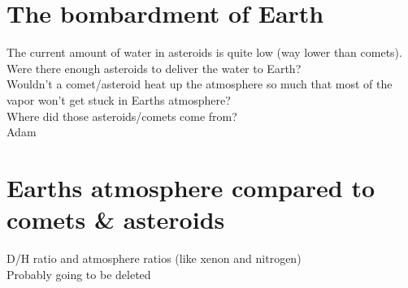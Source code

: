 \documentclass[11pt]{article}
\begin{document}
\section{The bombardment of Earth}
The current amount of water in asteroids is quite low (way lower than comets). Were there enough asteroids to deliver the water to Earth?\\
Wouldn't a comet/asteroid heat up the atmosphere so much that most of the vapor won't get stuck in Earths atmosphere?\\
Where did those asteroids/comets come from?\\
Adam

\newpage
\section{Earths atmosphere compared to comets \& asteroids}
D/H ratio and atmosphere ratios (like xenon and nitrogen)\\
Probably going to be deleted


\newpage				%



\newpage				%



\newpage				%


\end{document}
